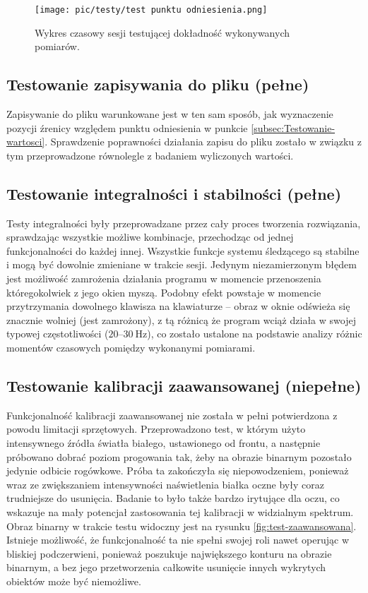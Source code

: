 \documentclass[a4paper,twoside,12pt]{book}
\begin{document}
\begin{figure}[htbp]
	\centering
	\texttt{[image: pic/testy/test punktu odniesienia.png]}
	\caption{Wykres czasowy sesji testującej dokładność wykonywanych pomiarów.}
	\label{fig:test-pomiary}
\end{figure}

\subsection{Testowanie zapisywania do pliku (pełne)}
\label{subsec:Testowanie-zapisywania}

Zapisywanie do pliku warunkowane jest w ten sam sposób, jak wyznaczenie pozycji źrenicy względem punktu odniesienia w punkcie \ref{subsec:Testowanie-wartosci}. Sprawdzenie poprawności działania zapisu do pliku zostało w związku z tym przeprowadzone równolegle z badaniem wyliczonych wartości.

\subsection{Testowanie integralności i stabilności (pełne)}
\label{subsec:Testowanie-interakcji}

Testy integralności były przeprowadzane przez cały proces tworzenia rozwiązania, sprawdzając wszystkie możliwe kombinacje, przechodząc od jednej funkcjonalności do każdej innej. Wszystkie funkcje systemu śledzącego są stabilne i mogą być dowolnie zmieniane w trakcie sesji. Jedynym niezamierzonym błędem jest możliwość zamrożenia działania programu w momencie przenoszenia któregokolwiek z jego okien myszą. Podobny efekt powstaje w momencie przytrzymania dowolnego klawisza na klawiaturze -- obraz w oknie odświeża się znacznie wolniej (jest zamrożony), z tą różnicą że program wciąż działa w swojej typowej częstotliwości ($\numrange{20}{30} \ \unit{\hertz}$), co zostało ustalone na podstawie analizy różnic momentów czasowych pomiędzy wykonanymi pomiarami.

\subsection{Testowanie kalibracji zaawansowanej (niepełne)}
\label{subsec:Testowanie-zaawansowanej}

Funkcjonalność kalibracji zaawansowanej nie została w pełni potwierdzona z powodu limitacji sprzętowych. Przeprowadzono test, w którym użyto intensywnego źródła światła białego, ustawionego od frontu, a następnie próbowano dobrać poziom progowania tak, żeby na obrazie binarnym pozostało jedynie odbicie rogówkowe. Próba ta zakończyła się niepowodzeniem, ponieważ wraz ze zwiększaniem intensywności naświetlenia białka oczne były coraz trudniejsze do usunięcia. Badanie to było także bardzo irytujące dla oczu, co wskazuje na mały potencjał zastosowania tej kalibracji w widzialnym spektrum. Obraz binarny w trakcie testu widoczny jest na rysunku \ref{fig:test-zaawansowana}. Istnieje możliwość, że funkcjonalność ta nie spełni swojej roli nawet operując w bliskiej podczerwieni, ponieważ poszukuje największego konturu na obrazie binarnym, a bez jego przetworzenia całkowite usunięcie innych wykrytych obiektów może być niemożliwe.
\end{document}
